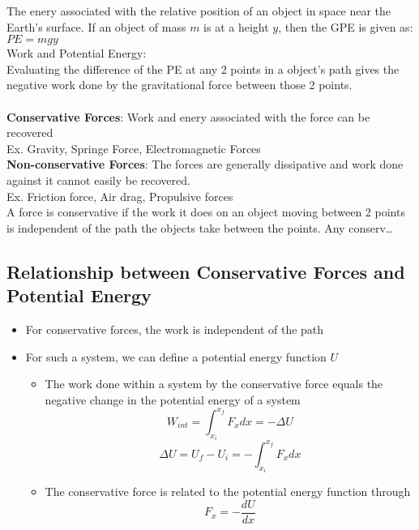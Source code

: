 \documentclass[]{article}
\begin{document}
The enery associated with the relative position of an object in space near the Earth's surface. If an object of mass $m$ is at a height $y$, then the GPE is given as:\\
$PE = mgy$\\
Work and Potential Energy:\\
Evaluating the difference of the PE at any 2 points in a object's path gives the negative work done by the gravitational force between those 2 points.\\
\\
\textbf{Conservative Forces}: Work and enery associated with the force can be recovered\\
Ex. Gravity, Springe Force, Electromagnetic Forces\\
\textbf{Non-conservative Forces}: The forces are generally dissipative and work done against it cannot easily be recovered.\\
Ex. Friction force, Air drag, Propulsive forces\\

A force is conservative if the work it does on an object moving between 2 points is independent of the path the objects take between the points. Any conserv\dots


\subsection*{Relationship between Conservative Forces and Potential Energy}
\begin{itemize}
    \item For conservative forces, the work is independent of the path
    \item For such a system, we can define a potential energy function $U$
    \begin{itemize}
        \item The work done within a system by the conservative force equals the negative change in the potential energy of a system\\
        \begin{equation*}
            W_{int} = \int_{x_i}^{x_f}F_xdx = -\Delta{U}
        \end{equation*}
        \begin{equation*}
            \Delta U = U_f-U_i = -\int_{x_i}^{x_f}F_xdx
        \end{equation*}
        \item The conservative force is related to the potential energy function through\\
        \begin{equation*}
            F_x = -\frac{dU}{dx}
        \end{equation*}
    \end{itemize}
\end{itemize}
\end{document}
